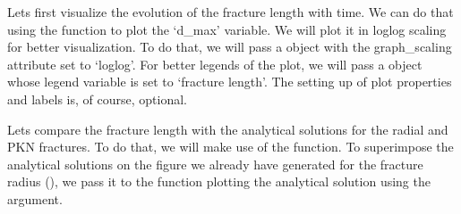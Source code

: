 \documentclass[letterpaper,10pt,english]{sphinxmanual}
\begin{document}
\sphinxAtStartPar
Lets first visualize the evolution of the fracture length with time. We can do that using the  function to plot the ‘d\_max’ variable. We will plot it in loglog scaling for better visualization. To do that, we will pass a  object with the graph\_scaling attribute set to ‘loglog’. For better legends of the plot, we will pass a  object whose legend variable is set to ‘fracture length’. The setting up of plot properties and labels is, of course, optional.

\begin{sphinxVerbatim}[commandchars=\\\{\}]
  
  

  

              
\end{sphinxVerbatim}

\sphinxAtStartPar
Lets compare the fracture length with the analytical solutions for the radial and PKN fractures. To do that, we will make use of the  function. To superimpose the analytical solutions on the figure we already have generated for the fracture radius (), we pass it to the function plotting the analytical solution using the  argument.
\end{document}
